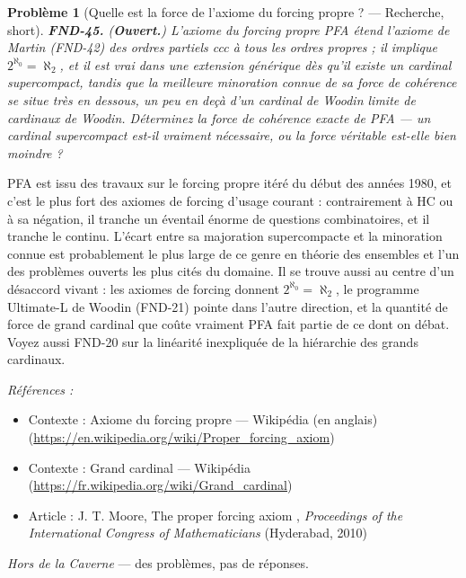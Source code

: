 \documentclass[11pt]{article}
\newtheorem{problem}{Problème}
\newenvironment{refs}{\par\small\noindent\emph{Références :}\begin{itemize}\setlength\itemsep{0pt}}{\end{itemize}\normalsize}
\begin{document}
\bigskip

\begin{problem}[{Quelle est la force de l'axiome du forcing propre ? --- Recherche, short}]
\textbf{FND-45.} (\textbf{Ouvert.}) L'axiome du forcing propre PFA étend
l'axiome de Martin (FND-42) des ordres partiels ccc à tous les ordres \textit{propres} ; il implique
$ 2^{\aleph_0} = \aleph_2 $, et il est vrai dans une extension générique dès qu'il existe un
cardinal supercompact, tandis que la meilleure minoration connue de sa force de cohérence se situe
très en dessous, un peu en deçà d'un cardinal de Woodin limite de cardinaux de Woodin. Déterminez
la force de cohérence exacte de PFA --- un cardinal supercompact est-il vraiment nécessaire, ou la
force véritable est-elle bien moindre ?
\end{problem}

\noindent PFA est issu des travaux sur le forcing propre itéré du début des années 1980,
et c'est le plus fort des axiomes de forcing d'usage courant : contrairement à HC ou à sa négation,
il tranche un éventail énorme de questions combinatoires, et il tranche le continu. L'écart entre
sa majoration supercompacte et la minoration connue est probablement le plus large de ce genre en
théorie des ensembles et l'un des problèmes ouverts les plus cités du domaine. Il se trouve aussi
au centre d'un désaccord vivant : les axiomes de forcing donnent $ 2^{\aleph_0} = \aleph_2 $, le
programme Ultimate-L de Woodin (FND-21) pointe dans l'autre direction, et la quantité de force de
grand cardinal que coûte vraiment PFA fait partie de ce dont on débat. Voyez aussi FND-20 sur la
linéarité inexpliquée de la hiérarchie des grands cardinaux.

\begin{refs}
\item Contexte : Axiome du forcing propre --- Wikipédia (en anglais) (\url{https://en.wikipedia.org/wiki/Proper_forcing_axiom})
\item Contexte : Grand cardinal --- Wikipédia (\url{https://fr.wikipedia.org/wiki/Grand_cardinal})
\item Article : J. T. Moore, \og{} The proper forcing axiom \fg{}, \textit{Proceedings of the International Congress of Mathematicians} (Hyderabad, 2010)
\end{refs}

\bigskip


\vfill
\noindent\emph{Hors de la Caverne} --- des probl\`emes, pas de r\'eponses.
\end{document}
